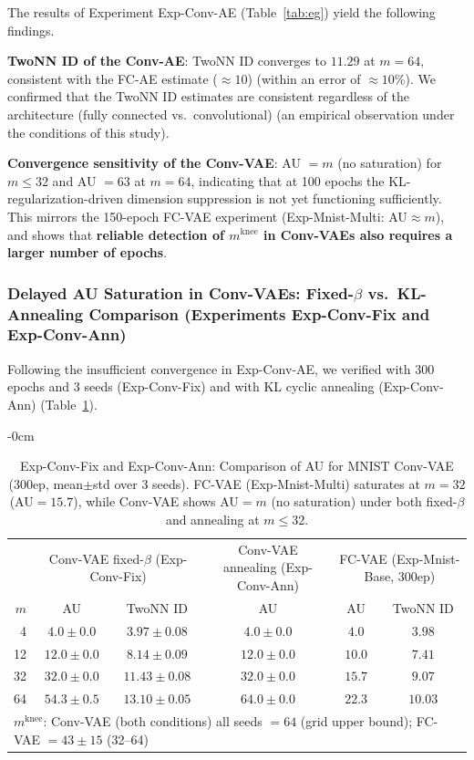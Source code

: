 \documentclass[make,article,submit,pdftex,moreauthors]{Definitions/mdpi}
\newcommand{\mknee}{m^{\mathrm{knee}}}
\begin{document}
The results of Experiment Exp-Conv-AE (Table~\ref{tab:eg}) yield the following findings.

\textbf{TwoNN ID of the Conv-AE}: TwoNN ID converges to $11.29$ at $m = 64$,
consistent with the FC-AE estimate ($\approx 10$) (within an error of $\approx 10\%$).
We confirmed that the TwoNN ID estimates are consistent regardless of the architecture
(fully connected vs.\ convolutional)
(an empirical observation under the conditions of this study).

\textbf{Convergence sensitivity of the Conv-VAE}: AU $= m$ (no saturation) for $m \leq 32$ and AU $= 63$ at $m = 64$,
indicating that at 100 epochs the KL-regularization-driven dimension suppression is not yet functioning sufficiently.
This mirrors the 150-epoch FC-VAE experiment (Exp-Mnist-Multi: AU$\approx m$), and shows that
\textbf{reliable detection of $\mknee$ in Conv-VAEs also requires a larger number of epochs}.

\subsubsection{Delayed AU Saturation in Conv-VAEs: Fixed-$\beta$ vs.\ KL-Annealing Comparison (Experiments Exp-Conv-Fix and Exp-Conv-Ann)}
\label{sec:exp_conv_300ep}

Following the insufficient convergence in Exp-Conv-AE, we verified with 300 epochs and 3 seeds (Exp-Conv-Fix)
and with KL cyclic annealing (Exp-Conv-Ann)
(Table~\ref{tab:eh_conv_vae}).

\begin{table}[H]
\begin{adjustwidth}{-\extralength}{0cm}
\centering
\caption{Exp-Conv-Fix and Exp-Conv-Ann: Comparison of AU for MNIST Conv-VAE (300ep, mean$\pm$std over 3 seeds). FC-VAE (Exp-Mnist-Multi) saturates at $m=32$ (AU$=15.7$), while Conv-VAE shows AU$=m$ (no saturation) under both fixed-$\beta$ and annealing at $m \leq 32$.}
\label{tab:eh_conv_vae}
\small
\begin{tabular}{r ccc cc}
\toprule
 & \multicolumn{2}{c}{Conv-VAE fixed-$\beta$ (Exp-Conv-Fix)} & \multicolumn{1}{c}{Conv-VAE annealing (Exp-Conv-Ann)} & \multicolumn{2}{c}{FC-VAE (Exp-Mnist-Base, 300ep)} \\
$m$ & AU & TwoNN ID & AU & AU & TwoNN ID \\
\midrule
 4 & $4.0\pm0.0$ & $3.97\pm0.08$ & $4.0\pm0.0$ & $4.0$ & $3.98$ \\
12 & $12.0\pm0.0$ & $8.14\pm0.09$ & $12.0\pm0.0$ & $10.0$ & $7.41$ \\
32 & $32.0\pm0.0$ & $11.43\pm0.08$ & $32.0\pm0.0$ & $15.7$ & $9.07$ \\
64 & $54.3\pm0.5$ & $13.10\pm0.05$ & $64.0\pm0.0$ & $22.3$ & $10.03$ \\
\midrule
\multicolumn{6}{l}{$\mknee$: Conv-VAE (both conditions) all seeds $=64$ (grid upper bound); FC-VAE $=43\pm15$ (32--64)} \\
\bottomrule
\end{tabular}
\end{adjustwidth}
\end{table}
\end{document}
